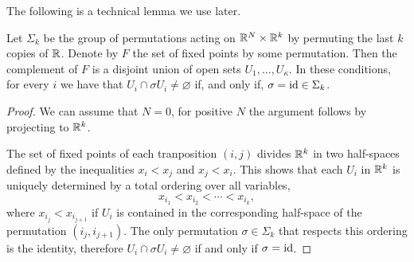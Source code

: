 \documentclass[a4paper,12pt]{amsart}
\begin{document}
The following is a technical lemma we use later.

\begin{lemma}\label{lem:permutationsofRk}
Let $\Sigma_k$ be the group of permutations acting on $\mathbb{R}^N\times\mathbb{R}^k$ by permuting the last $k$ copies of $\mathbb{R}$. Denote by $F$ the set of fixed points by some permutation. Then the complement of $F$ is a disjoint union of open sets $U_1,\dots,U_\kappa$. In these conditions, for every $i$ we have that $U_i\cap\sigma U_i\neq\varnothing$ if, and only if, $\sigma=\operatorname{id}\in\Sigma_k$.
\end{lemma}
\begin{proof}
We can assume that $N=0$, for positive $N$ the argument follows by projecting to $\mathbb{R}^k$.

The set of fixed points of each tranposition $(i,j)$ divides $\mathbb{R}^k$ in two half-spaces defined by the inequalities $x_{i} < x_j$ and $x_j < x_i$.
This shows that each $U_i$ in $\mathbb{R}^k$ is uniquely determined by a total ordering over all variables,
$$x_{i_1} < x_{i_2} < \cdots < x_{i_k},$$
where  $x_{i_j} < x_{i_{j+1}}$ if $U_i$ is contained in the corresponding half-space of the permutation $(i_j,i_{j+1})$.
The only permutation $\sigma \in \Sigma_k$ that respects this ordering is the identity, therefore $U_i\cap\sigma U_i\neq\varnothing$ if and only if $\sigma = \operatorname{id}$.
\end{proof}
\end{document}
